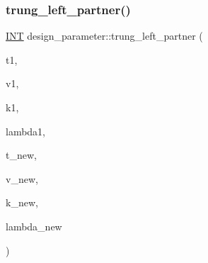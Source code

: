 \subsubsection{\texorpdfstring{trung\+\_\+left\+\_\+partner()}{trung\_left\_partner()}}
{\footnotesize\ttfamily \mbox{\hyperlink{galois_8h_a09fddde158a3a20bd2dcadb609de11dc}{I\+NT}} design\+\_\+parameter\+::trung\+\_\+left\+\_\+partner (\begin{DoxyParamCaption}\item[{\mbox{\hyperlink{galois_8h_a09fddde158a3a20bd2dcadb609de11dc}{I\+NT}} \&}]{t1,  }\item[{\mbox{\hyperlink{galois_8h_a09fddde158a3a20bd2dcadb609de11dc}{I\+NT}} \&}]{v1,  }\item[{\mbox{\hyperlink{galois_8h_a09fddde158a3a20bd2dcadb609de11dc}{I\+NT}} \&}]{k1,  }\item[{\mbox{\hyperlink{classdiscreta__base}{discreta\+\_\+base}} \&}]{lambda1,  }\item[{\mbox{\hyperlink{galois_8h_a09fddde158a3a20bd2dcadb609de11dc}{I\+NT}} \&}]{t\+\_\+new,  }\item[{\mbox{\hyperlink{galois_8h_a09fddde158a3a20bd2dcadb609de11dc}{I\+NT}} \&}]{v\+\_\+new,  }\item[{\mbox{\hyperlink{galois_8h_a09fddde158a3a20bd2dcadb609de11dc}{I\+NT}} \&}]{k\+\_\+new,  }\item[{\mbox{\hyperlink{classdiscreta__base}{discreta\+\_\+base}} \&}]{lambda\+\_\+new }\end{DoxyParamCaption})}

\mbox{\label{classdesign__parameter_a866f154ac4db93b6000a155c35d9f8af}} 
